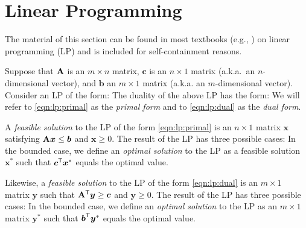 \section{Linear Programming} \label{app:lp}

The material of this section can be found in most textbooks (e.g., \cite{mg07}) on linear programming (LP) and is included for self-containment reasons.

\vgap

Suppose that $\mathbf{A}$ is an $m \times n$ matrix, $\bm{c}$ is an $n \times 1$ matrix (a.k.a.\ an $n$-dimensional vector), and $\bm{b}$ an $m \times 1$ matrix (a.k.a.
an $m$-dimensional vector). Consider an LP of the form:
The duality of the above LP has the form:
We will refer to \eqref{eqn:lp:primal} as the {\em primal form} and to \eqref{eqn:lp:dual} as the {\em dual form}.

\vgap

A {\em feasible solution} to the LP of the form \eqref{eqn:lp:primal} is an $n \times 1$ matrix $\bm{x}$ satisfying $\mathbf{A}\textrm{\boldmath${x}$} \le \textrm{\boldmath${b}$}$ and $\bm{x} \ge 0$. The result of the LP has three possible cases:
In the bounded case, we define an {\em optimal solution} to the LP as a feasible solution $\bm{x}^*$ such that $\textrm{\boldmath${c}$}^{\mathsf{T}} \textrm{\boldmath${x}$}^*$ equals the optimal value.

\vgap

Likewise, a {\em feasible solution} to the LP of the form \eqref{eqn:lp:dual} is an $m \times 1$ matrix $\bm{y}$ such that $\mathbf{A}^{\mathsf{T}} \textrm{\boldmath${y}$} \ge \textrm{\boldmath${c}$}$ and $\bm{y} \ge 0$. The result of the LP has three possible cases:
In the bounded case, we define an {\em optimal solution} to the LP as an $m \times 1$ matrix $\bm{y}^*$ such that $\textrm{\boldmath${b}$}^{\mathsf{T}} \textrm{\boldmath${y}$}^*$ equals the optimal value.

